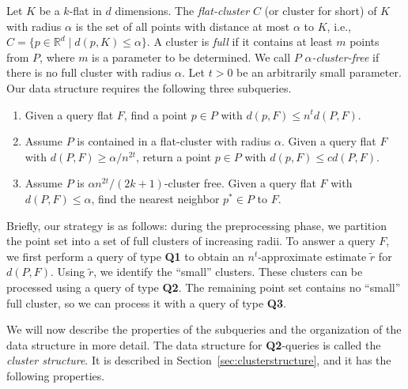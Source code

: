 \documentclass[a4paper,11pt]{paper}
\newcommand{\mathset}[1]{\ensuremath {\mathbb {#1}}}
\newcommand{\R}{\mathset{R}}
\begin{document}
Let $K$ be a $k$-flat in $d$ dimensions.
The \textit{flat-cluster} $C$ (or cluster for short)
of $K$ with radius $\alpha$ is
the set of all points with distance at most $\alpha$ to $K$, i.e.,
$C = \{ p \in \R^d \mid d(p,K) \leq \alpha \}$.
A cluster is \emph{full}
if it contains at least $m$ points from $P$, where $m$ is a
parameter to be determined. We call $P$
\textit{$\alpha$-cluster-free} if there is no full cluster with
radius $\alpha$.
Let $t > 0$ be an arbitrarily small parameter.
Our data structure requires the following three subqueries.
\begin{enumerate}[\bfseries Q1:]
 \item
\label{itm:q1}
Given a query flat $F$,
find a point  $p \in P$ with $d(p,F) \leq n^t d(P, F)$.
\item
\label{itm:q2}
Assume $P$ is contained in a flat-cluster with radius $\alpha$.
Given a query flat $F$ with  $d(P,F) \geq \alpha/n^{2t}$,
return a point $p \in P$ with $d(p,F) \leq
cd(P,F)$.
\item
\label{itm:q3}
Assume $P$ is $\alpha n^{2t}/(2k+1)$-cluster free.
Given  a query flat $F$ with
$d(P,F) \leq \alpha$, find the nearest neighbor $p^*\in P$ to $F$.
\end{enumerate}

Briefly, our strategy is as follows: during the preprocessing
phase, we partition the point set into a set of full
clusters of increasing radii. To answer a query $F$, we first perform
a query of type \textbf{Q1} to obtain an $n^t$-approximate
estimate $\widetilde{r}$ for $d(P, F)$. Using $\widetilde{r}$,
we identify the ``small'' clusters. These clusters can be
processed using a query of type \textbf{Q2}.
The remaining point set contains no ``small'' full cluster, so we
can process it with a query of type \textbf{Q3}.

We will now describe the properties of the subqueries and the
organization of the data structure in more detail.
The data structure for \textbf{Q2}-queries is called the
\emph{cluster structure}. It is described in
Section~\ref{sec:clusterstructure}, and it has
the following properties.
\end{document}

